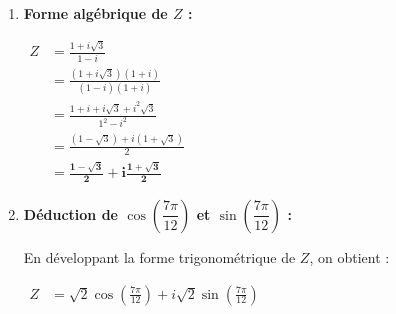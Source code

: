 \documentclass[12pt,a4paper]{article}
\begin{document}
\begin{enumerate}
\begin{itemize}
        \item Pour $Z = \dfrac{z_1}{z_2}$ :
        
        $
        \begin{aligned}
            |Z| &= \frac{|z_1|}{|z_2|}\\
            &= \frac{2}{\sqrt{2}}\\
            &= \mathbf{\sqrt{2}}
        \end{aligned}
        $
        
        $
        \begin{aligned}
            \arg(Z) &\equiv \arg(z_1) - \arg(z_2) \pmod{2\pi}\\
            &\equiv \frac{\pi}{3} - \left(-\frac{\pi}{4}\right) \pmod{2\pi}\\
            &\equiv \frac{\pi}{3} + \frac{\pi}{4}\\
            &\equiv \frac{4\pi + 3\pi}{12}\\
            &\equiv \mathbf{\frac{7\pi}{12}} \pmod{2\pi}
        \end{aligned}
        $
        
        On en déduit la forme trigonométrique de $Z$ :
        
        $
        Z = \mathbf{\sqrt{2}\left(\cos\frac{7\pi}{12} + i\sin\frac{7\pi}{12}\right)}
        $
    \end{itemize}

    \item \textbf{Forme algébrique de $Z$ :}
    
    $
    \begin{aligned}
        Z &= \frac{1 + i\sqrt{3}}{1 - i}\\
        &= \frac{(1 + i\sqrt{3})(1 + i)}{(1 - i)(1 + i)}\\
        &= \frac{1 + i + i\sqrt{3} + i^2\sqrt{3}}{1^2 - i^2}\\
        &= \frac{(1 - \sqrt{3}) + i(1 + \sqrt{3})}{2}\\
        &= \mathbf{\frac{1 - \sqrt{3}}{2} + i\frac{1 + \sqrt{3}}{2}}
    \end{aligned}
    $

    \item \textbf{Déduction de $\cos\left(\dfrac{7\pi}{12}\right)$ et $\sin\left(\dfrac{7\pi}{12}\right)$ :}
    
    En développant la forme trigonométrique de $Z$, on obtient :
    
    $
    \begin{aligned}
        Z &= \sqrt{2}\cos\left(\frac{7\pi}{12}\right) + i\sqrt{2}\sin\left(\frac{7\pi}{12}\right)
    \end{aligned}
    $
    

\end{enumerate}
\end{document}
